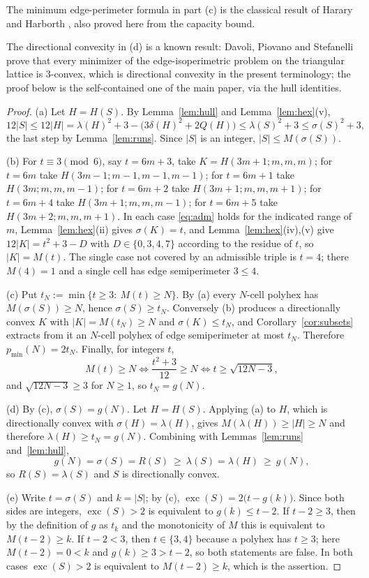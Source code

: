 \documentclass[11pt]{article}
\theoremstyle{plain}
\theoremstyle{definition}
\theoremstyle{remark}
\DeclareMathOperator{\exc}{exc}
\begin{document}
The minimum edge-perimeter formula in part (c) is the classical result
of Harary and Harborth \cite{HararyHarborth1976}, also proved here from
the capacity bound.

The directional convexity in (d) is a known result: Davoli, Piovano and Stefanelli
\cite[Proposition~3.3]{DavoliPiovanoStefanelli2017} prove that every minimizer of the
edge-isoperimetric problem on the triangular lattice is \(3\)-convex, which is
directional convexity in the present terminology; the proof below is the self-contained
one of the main paper, via the hull identities.

\begin{proof}
(a) Let \(H=H(S)\). By Lemma~\ref{lem:hull} and Lemma~\ref{lem:hex}(v),
\[
   12|S|\le12|H|=\lambda(H)^{2}+3-\bigl(3\delta(H)^{2}+2Q(H)\bigr)\le\lambda(S)^{2}+3
   \le\sigma(S)^{2}+3 ,
\]
the last step by Lemma~\ref{lem:runs}. Since \(|S|\) is an integer, \(|S|\le M(\sigma(S))\).

(b) For \(t\equiv3\pmod 6\), say \(t=6m+3\), take \(K=H(3m+1;m,m,m)\); for \(t=6m\) take
\(H(3m-1;m-1,m-1,m-1)\); for \(t=6m+1\) take \(H(3m;m,m,m-1)\); for \(t=6m+2\) take
\(H(3m+1;m,m,m+1)\); for \(t=6m+4\) take \(H(3m+1;m,m,m-1)\); for \(t=6m+5\) take
\(H(3m+2;m,m,m+1)\). In each case \eqref{eq:adm} holds for the indicated range of \(m\),
Lemma~\ref{lem:hex}(ii) gives \(\sigma(K)=t\), and Lemma~\ref{lem:hex}(iv),(v) give
\(12|K|=t^{2}+3-D\) with \(D\in\{0,3,4,7\}\) according to the residue of \(t\), so
\(|K|=M(t)\). The single case not covered by an admissible triple is \(t=4\); there
\(M(4)=1\) and a single cell has edge semiperimeter \(3\le4\).

(c) Put \(t_{N}:=\min\{t\ge3:\ M(t)\ge N\}\). By (a) every \(N\)-cell polyhex has
\(M(\sigma(S))\ge N\), hence \(\sigma(S)\ge t_{N}\). Conversely (b) produces a
directionally convex \(K\) with \(|K|=M(t_{N})\ge N\) and \(\sigma(K)\le t_{N}\), and
Corollary~\ref{cor:subsets} extracts from it an \(N\)-cell polyhex of edge semiperimeter at
most \(t_{N}\). Therefore \(p_{\min}(N)=2t_{N}\). Finally, for integers \(t\),
\[
   M(t)\ge N\iff \frac{t^{2}+3}{12}\ge N\iff t\ge\sqrt{12N-3},
\]
and \(\sqrt{12N-3}\ge3\) for \(N\ge1\), so \(t_{N}=g(N)\).

(d) By (c), \(\sigma(S)=g(N)\). Let \(H=H(S)\). Applying (a) to \(H\), which is
directionally convex with \(\sigma(H)=\lambda(H)\), gives \(M(\lambda(H))\ge|H|\ge N\) and
therefore \(\lambda(H)\ge t_{N}=g(N)\). Combining with Lemmas~\ref{lem:runs}
and~\ref{lem:hull},
\[
   g(N)=\sigma(S)=R(S)\ \ge\ \lambda(S)=\lambda(H)\ \ge\ g(N),
\]
so \(R(S)=\lambda(S)\) and \(S\) is directionally convex.

(e) Write \(t=\sigma(S)\) and \(k=|S|\); by (c), \(\exc(S)=2\bigl(t-g(k)\bigr)\). Since
both sides are integers, \(\exc(S)>2\) is equivalent to \(g(k)\le t-2\). If \(t-2\ge3\),
then by the definition of \(g\) as \(t_{k}\) and the monotonicity of \(M\) this is
equivalent to \(M(t-2)\ge k\). If \(t-2<3\), then \(t\in\{3,4\}\) because a polyhex has
\(t\ge3\); here \(M(t-2)=0<k\) and \(g(k)\ge3>t-2\), so both statements are false.
In both cases \(\exc(S)>2\) is equivalent to \(M(t-2)\ge k\), which is the assertion.
\end{proof}
\end{document}
